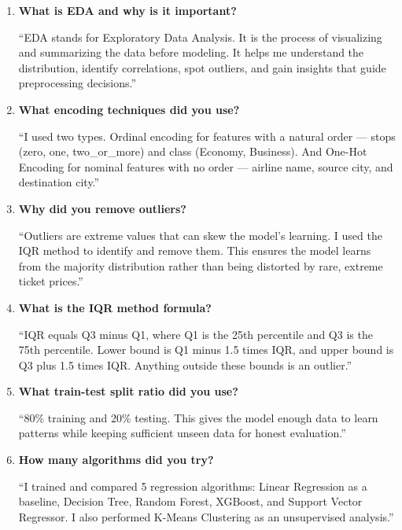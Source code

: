 \documentclass[12pt, a4paper]{article}
\begin{document}
\begin{enumerate}[leftmargin=*, label=\textbf{Q\arabic*.}]
\item \textbf{What is EDA and why is it important?}
\begin{tipbox}[title=Answer]
    ``EDA stands for Exploratory Data Analysis. It is the process of visualizing and summarizing the data before modeling. It helps me understand the distribution, identify correlations, spot outliers, and gain insights that guide preprocessing decisions.''
\end{tipbox}

\item \textbf{What encoding techniques did you use?}
\begin{tipbox}[title=Answer]
    ``I used two types. Ordinal encoding for features with a natural order — stops (zero, one, two\_or\_more) and class (Economy, Business). And One-Hot Encoding for nominal features with no order — airline name, source city, and destination city.''
\end{tipbox}

\item \textbf{Why did you remove outliers?}
\begin{tipbox}[title=Answer]
    ``Outliers are extreme values that can skew the model's learning. I used the IQR method to identify and remove them. This ensures the model learns from the majority distribution rather than being distorted by rare, extreme ticket prices.''
\end{tipbox}

\item \textbf{What is the IQR method formula?}
\begin{tipbox}[title=Answer]
    ``IQR equals Q3 minus Q1, where Q1 is the 25th percentile and Q3 is the 75th percentile. Lower bound is Q1 minus 1.5 times IQR, and upper bound is Q3 plus 1.5 times IQR. Anything outside these bounds is an outlier.''
\end{tipbox}

\item \textbf{What train-test split ratio did you use?}
\begin{tipbox}[title=Answer]
    ``80\% training and 20\% testing. This gives the model enough data to learn patterns while keeping sufficient unseen data for honest evaluation.''
\end{tipbox}

\item \textbf{How many algorithms did you try?}
\begin{tipbox}[title=Answer]
    ``I trained and compared 5 regression algorithms: Linear Regression as a baseline, Decision Tree, Random Forest, XGBoost, and Support Vector Regressor. I also performed K-Means Clustering as an unsupervised analysis.''
\end{tipbox}


\end{enumerate}
\end{document}
